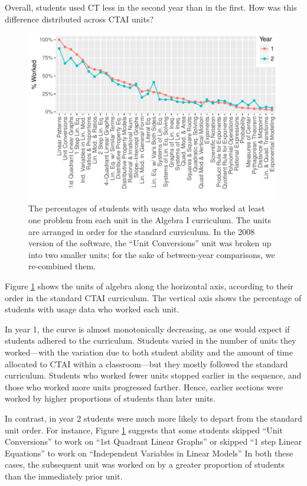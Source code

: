 \documentclass[notitlepage,12pt]{jedm}\usepackage[]{graphicx}\usepackage[]{color}
\makeatletter
\def\maxwidth{ %
  \ifdim\Gin@nat@width>\linewidth
    \linewidth
  \else
    \Gin@nat@width
  \fi
}
\makeatother
\begin{document}
Overall, students used CT less in the second year than in the
first.
How was this difference distributed across CTAI units?

\begin{figure}
  \centering

\includegraphics[width=\maxwidth]{figure/whichUnits-1} 

\caption{The percentages of students with usage data who worked at
  least one problem from each unit in the Algebra I curriculum. The
  units are arranged in order for the standard curriculum. In the 2008
version of the software, the ``Unit Conversions'' unit was broken up
into two smaller units; for the sake of between-year comparisons, we
re-combined them.}
\label{fig:unitsWorked}
\end{figure}


Figure \ref{fig:unitsWorked} shows the units of algebra along the
horizontal axis, according to their order in the standard CTAI
curriculum.
The vertical axis shows the percentage of students with usage data who
worked each unit.

In year 1, the curve is almost monotonically decreasing, as one would
expect if students adhered to the curriculum.
Students varied in the number of units they worked---with the variation due
to both student ability and the amount of time allocated to CTAI
within a classroom---but they mostly followed the standard curriculum.
Students who worked fewer units stopped earlier in the sequence, and those who worked more units progressed farther.
Hence, earlier sections were worked by higher proportions of students
than later units.

In contrast, in year 2 students were much more likely to depart from the
standard unit order.
For instance, Figure \ref{fig:unitsWorked} suggests that some students
skipped ``Unit Conversions'' to work on  ``1st
Quadrant Linear Graphs'' or skipped ``1 step Linear Equations'' to work on ``Independent Variables in Linear Models''
In both these cases, the subsequent unit was worked on by a greater
proportion of students than the immediately prior unit.
\end{document}
